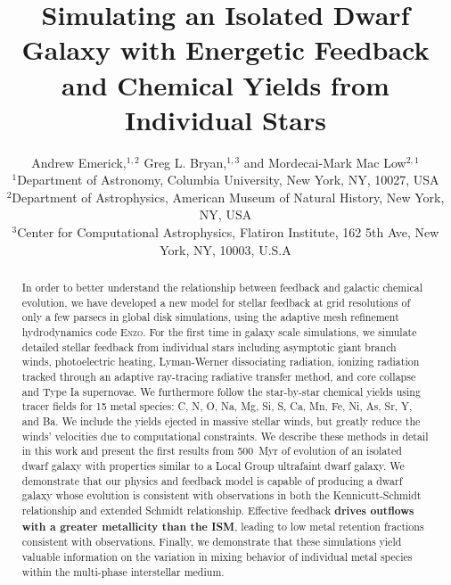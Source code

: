 \documentclass[fleqn,usenatbib,useAMS]{mnras}
\title[Feedback with Individual Stars]{Simulating an Isolated Dwarf Galaxy with Energetic Feedback and Chemical Yields from Individual Stars}
\author[A. Emerick et. al.]{
Andrew Emerick,$^{1,2}$
Greg L. Bryan,$^{1,3}$
and Mordecai-Mark Mac Low$^{2,1}$
\\
$^{1}$Department of Astronomy, Columbia University, New York, NY, 10027, USA\\
$^{2}$Department of Astrophysics, American Museum of Natural History, New York, NY, USA\\
$^{3}$Center for Computational Astrophysics, Flatiron Institute, 162 5th Ave, New York, NY, 10003, U.S.A}
\begin{document}
\label{firstpage}
\maketitle





\begin{abstract}
In order to better understand the relationship between feedback and galactic chemical evolution, we have developed a new model for stellar feedback at grid resolutions of only a few parsecs in global disk simulations, using the adaptive mesh refinement hydrodynamics code \textsc{Enzo}. For the first time in galaxy scale simulations, we simulate detailed stellar feedback from individual stars including asymptotic giant branch winds, photoelectric heating, Lyman-Werner dissociating radiation, ionizing radiation tracked through an adaptive ray-tracing radiative transfer method, and core collapse and Type Ia supernovae. We furthermore follow the star-by-star chemical yields using tracer fields for 15 metal species: C, N, O, Na, Mg, Si, S, Ca, Mn, Fe, Ni, As, Sr, Y, and Ba. We include the yields ejected in massive stellar winds, but greatly reduce the winds' velocities due to computational constraints. We describe these methods in detail in this work and present the first results from 500~Myr of evolution of an isolated dwarf galaxy with properties similar to a Local Group ultrafaint dwarf galaxy. We demonstrate that our physics and feedback model is capable of producing a dwarf galaxy whose evolution is consistent with observations in both the Kennicutt-Schmidt relationship and extended Schmidt relationship. Effective feedback \textbf{drives outflows with a greater metallicity than the ISM}, leading to low metal retention fractions consistent with observations. Finally, we demonstrate that these simulations yield valuable information on the variation in mixing behavior of individual metal species within the multi-phase interstellar medium.
\end{abstract}
\end{document}
